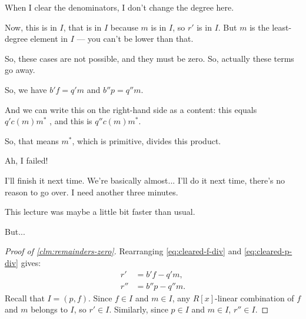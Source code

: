 \begin{proofWrapper}
\begin{speech}[00:41:26 - 00:42:45]
When I clear the denominators, I don't change the degree here.

Now, this is in $I$, that is in $I$ because $m$ is in $I$, so $r'$ is in $I$. But $m$ is the least-degree element in $I$ --- you can't be lower than that.

So, these cases are not possible, and they must be zero. So, actually these terms go away. 

So, we have $b' f = q' m$  and $b'' p = q'' m$. 

And we can write this on the right-hand side as a content: this equals $q' c(m) m^*$ , and this is $q'' c(m) m^*$. 

So, that means $m^*$, which is primitive, divides this product.

Ah, I failed! 

I'll finish it next time. We're basically almost... I'll do it next time, there's no reason to go over. I need another three minutes.

This lecture was maybe a little bit faster than usual.

But... 
\end{speech}

\begin{content}

\begin{proof}[Proof of \cref{clm:remainders-zero}]
Rearranging \eqref{eq:cleared-f-div} and \eqref{eq:cleared-p-div} gives:
\begin{align*}
r' &= b' f - q' m, \\
r'' &= b'' p - q'' m.
\end{align*}
Recall that $I = (p, f)$. Since $f \in I$ and $m \in I$, any $R[x]$-linear combination of $f$ and $m$ belongs to $I$, so $r' \in I$.
Similarly, since $p \in I$ and $m \in I$, $r'' \in I$.


\end{proof}
\end{content}
\end{proofWrapper}
